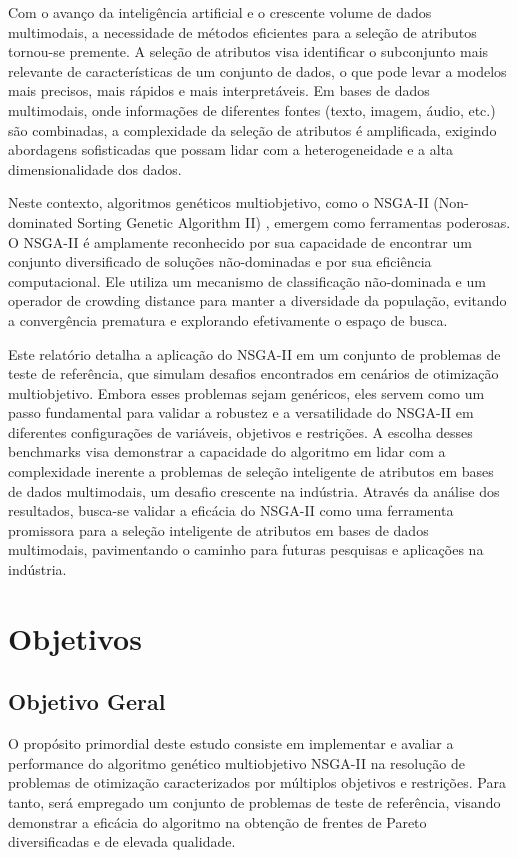 \documentclass[12pt,openright,oneside,a4paper,english,brazil]{abntex2}
\begin{document}
Com o avanço da inteligência artificial e o crescente volume de dados multimodais, a necessidade de métodos eficientes para a seleção de atributos tornou-se premente. A seleção de atributos visa identificar o subconjunto mais relevante de características de um conjunto de dados, o que pode levar a modelos mais precisos, mais rápidos e mais interpretáveis. Em bases de dados multimodais, onde informações de diferentes fontes (texto, imagem, áudio, etc.) são combinadas, a complexidade da seleção de atributos é amplificada, exigindo abordagens sofisticadas que possam lidar com a heterogeneidade e a alta dimensionalidade dos dados.

Neste contexto, algoritmos genéticos multiobjetivo, como o NSGA-II (Non-dominated Sorting Genetic Algorithm II) \cite{deb2002fast}, emergem como ferramentas poderosas. O NSGA-II é amplamente reconhecido por sua capacidade de encontrar um conjunto diversificado de soluções não-dominadas e por sua eficiência computacional. Ele utiliza um mecanismo de classificação não-dominada e um operador de crowding distance para manter a diversidade da população, evitando a convergência prematura e explorando efetivamente o espaço de busca.

Este relatório detalha a aplicação do NSGA-II em um conjunto de problemas de teste de referência, que simulam desafios encontrados em cenários de otimização multiobjetivo. Embora esses problemas sejam genéricos, eles servem como um passo fundamental para validar a robustez e a versatilidade do NSGA-II em diferentes configurações de variáveis, objetivos e restrições. A escolha desses benchmarks visa demonstrar a capacidade do algoritmo em lidar com a complexidade inerente a problemas de seleção inteligente de atributos em bases de dados multimodais, um desafio crescente na indústria. Através da análise dos resultados, busca-se validar a eficácia do NSGA-II como uma ferramenta promissora para a seleção inteligente de atributos em bases de dados multimodais, pavimentando o caminho para futuras pesquisas e aplicações na indústria.


\chapter{Objetivos}
\section{Objetivo Geral}
O propósito primordial deste estudo consiste em implementar e avaliar a performance do algoritmo genético multiobjetivo NSGA-II na resolução de problemas de otimização caracterizados por múltiplos objetivos e restrições. Para tanto, será empregado um conjunto de problemas de teste de referência, visando demonstrar a eficácia do algoritmo na obtenção de frentes de Pareto diversificadas e de elevada qualidade.
\end{document}
